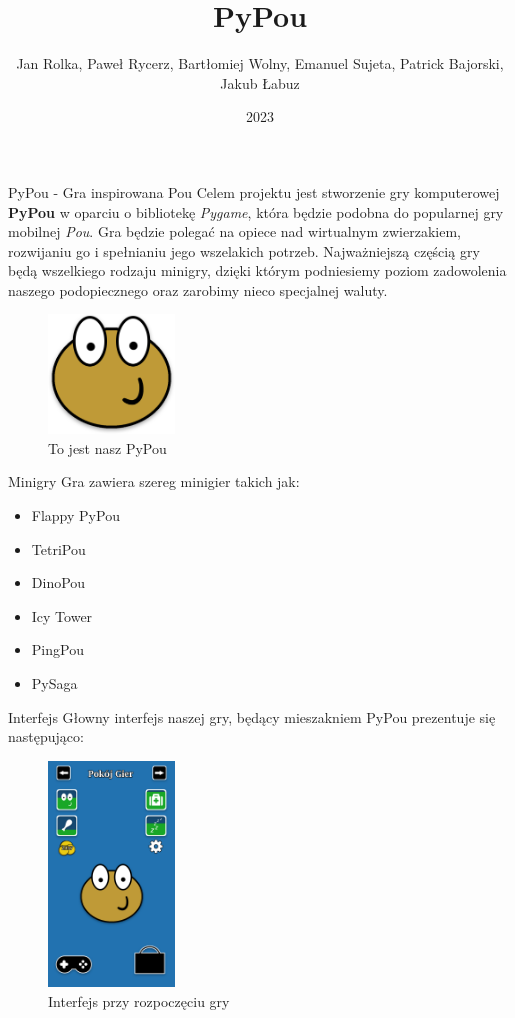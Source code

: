 \documentclass{beamer}
\title{PyPou}
\author{Jan Rolka, Paweł Rycerz, Bartłomiej Wolny, Emanuel Sujeta, Patrick Bajorski, Jakub Łabuz}
\institute{AGH}
\date{2023}
\begin{document}
\frame{\titlepage}

\begin{frame}{PyPou - Gra inspirowana Pou}
Celem projektu jest stworzenie gry komputerowej \textbf{PyPou} w oparciu o bibliotekę \textit{Pygame}, która będzie podobna do popularnej gry mobilnej \textit{Pou}. Gra będzie polegać na opiece nad wirtualnym zwierzakiem, rozwijaniu go i spełnianiu jego wszelakich potrzeb. Najważniejszą częścią gry będą wszelkiego rodzaju minigry, dzięki którym podniesiemy poziom zadowolenia naszego podopiecznego oraz zarobimy nieco specjalnej waluty.
\begin{figure}[h]
  \centering
  \includegraphics[width=0.3\textwidth]{grafiki/PyPou.png}
  \caption{To jest nasz PyPou}
\end{figure}
\end{frame}

\begin{frame}{Minigry}
    Gra zawiera szereg minigier takich jak:
    \begin{itemize}
        \item Flappy PyPou
        \item TetriPou
        \item DinoPou
        \item Icy Tower
        \item PingPou
        \item PySaga
    \end{itemize}
\end{frame}

\begin{frame}{Interfejs}
    Głowny interfejs naszej gry, będący mieszakniem PyPou prezentuje się następująco:
    \begin{figure}
        \centering
        \includegraphics[width=0.3\textwidth]{grafiki/prototypUI3.png}
        \caption{Interfejs przy rozpoczęciu gry}
        \label{fig:UI1}
    \end{figure}
\end{frame}
\end{document}
